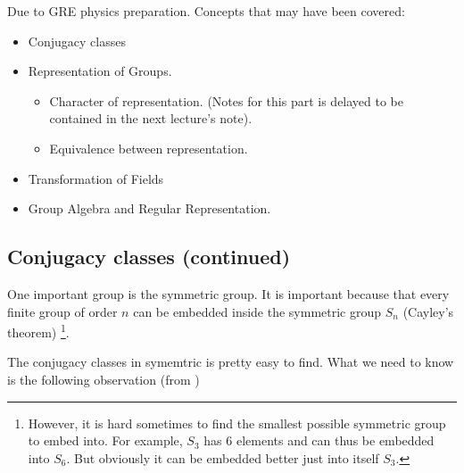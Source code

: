 
Due to GRE physics preparation. Concepts that may have been covered:

\begin{itemize}
    \item Conjugacy classes
    \item Representation of Groups.
        \begin{itemize}
            \item Character of representation. (Notes for this part is
                delayed to be contained in the next lecture's note).
            \item Equivalence between representation.
        \end{itemize}
    \item Transformation of Fields
    \item Group Algebra and Regular Representation.
\end{itemize}

\subsection{Conjugacy classes (continued)}
\label{sec:Conjugacy classes (continued)}

One important group is the symmetric group. It is important because
that every finite group of order $n$ can be embedded inside the
symmetric group $S_n$ (Cayley's theorem) \footnote{
    However, it is hard sometimes to find the smallest possible
    symmetric group to embed into. For example, $S_3$ has 6 elements
    and can thus be embedded into $S_6$. But obviously it can be
    embedded better just into itself $S_3$.
}.

The conjugacy classes in symemtric is pretty easy to find. What we
need to know is the following observation (from \cite{Ludeling})


